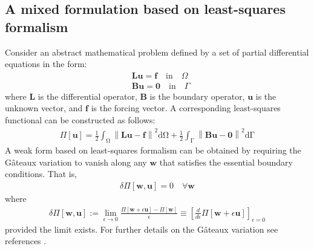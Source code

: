 \documentclass[11pt,reqno]{amsart}
\begin{document}
\subsection{A mixed formulation based on least-squares formalism}
Consider an abstract mathematical problem 
defined by a set of partial differential 
equations in the form:
\begin{align}
  & \mathbf{L}\mathbf{u} = \mathbf{f} 
  \quad \mathrm{in} \quad \Omega \\
& \mathbf{B}\mathbf{u} = \mathbf{0} 
  \quad \mathrm{in} \quad \Gamma
\end{align}
where $\mathbf{L}$ is the differential operator, 
$\mathbf{B}$ is the boundary operator, $\mathbf{u}$ 
is the unknown vector, and $\mathbf{f}$ is the 
forcing vector. A corresponding least-squares 
functional can be constructed as follows:
\begin{align}
  \Pi[\mathbf{u}] = \frac{1}{2}\int_{\mathrm{\Omega}}
  \left\|\mathbf{L}\mathbf{u} - \mathbf{f}\right\|^{2}
  \mathrm{d\Omega} + \frac{1}{2}\int_{\mathrm{\Gamma}}\left
  \|\mathbf{B}\mathbf{u} - \mathbf{0}\right\|^{2}\mathrm{d\Gamma}
\end{align}
A weak form based on least-squares formalism can 
be obtained by requiring the G\^{a}teaux variation 
to vanish along any $\mathbf{w}$ that satisfies 
the essential boundary conditions. That is,
\begin{align}
  \delta \Pi[\mathbf{w},\mathbf{u}] = 0 
  \quad \forall \mathbf{w}
\end{align}
where 
\begin{align}
  \delta\Pi[\mathbf{w},\mathbf{u}] := 
  \mathop{\mathrm{lim}}_{\epsilon\rightarrow 0}
  \frac{\Pi[\mathbf{w}+\epsilon\mathbf{u}] - 
    \Pi[\mathbf{w}]}{\epsilon} \equiv 
  \left[\frac{d}{d\epsilon}\Pi[\mathbf{w} 
      + \epsilon\mathbf{u}]\right]_{\epsilon=0}
\end{align}
provided the limit exists. For further details 
on the G\^{a}teaux variation see references 
\cite{Spivak,Holzapfel,Glowinski}.
\end{document}
